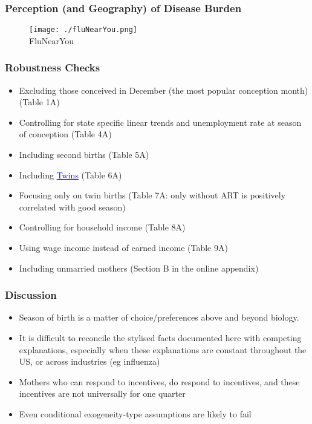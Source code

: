 \documentclass[10pt,letterpaper,subeqn]{beamer}
\begin{document}
\begin{frame}[label=flu]
\frametitle{Perception (and Geography) of Disease Burden}
\begin{figure}[htpb!]
  \centering
  \texttt{[image: ./fluNearYou.png]} \\
{\footnotesize FluNearYou}
\end{figure}
\end{frame}


\begin{frame}
\hypertarget{robustness}{}
\frametitle{Robustness Checks}
\begin{itemize}
\item Excluding those conceived in December (the most popular conception month) (Table 1A)
\item Controlling for state specific linear trends and unemployment rate at season of conception (Table 4A)
\item Including second births (Table 5A)
\item Including \hyperlink{twins}{\textcolor{blue}{Twins}} (Table 6A)
\item Focusing only on twin births (Table 7A: only without ART is positively correlated with good season)
\item Controlling for household income (Table 8A)
\item Using wage income instead of earned income (Table 9A)
\item Including unmarried mothers (Section B in the online appendix)
\end{itemize}
\end{frame}

\begin{frame}
\frametitle{Discussion}
\begin{itemize}
\item Season of birth is a matter of choice/preferences above and beyond biology.
\item It is difficult to reconcile the stylised facts documented here with competing explanations, especially when these explanations are constant throughout the US, or across industries (eg influenza)
\item Mothers who can respond to incentives, do respond to incentives, and these incentives are not universally for one quarter
\item Even conditional exogeneity-type assumptions are likely to fail
\end{itemize}
\end{frame}
\end{document}
